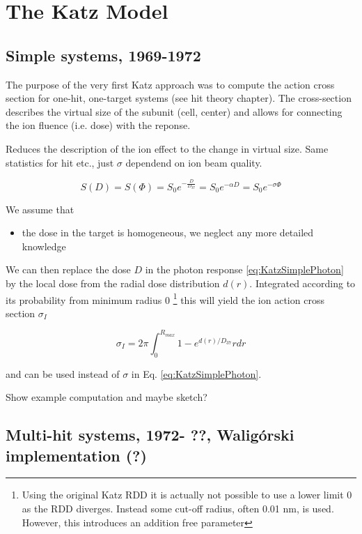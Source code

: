 \chapter{The Katz Model}

\section{Simple systems, 1969-1972}
\label{sec:KatzSimple}
The purpose of the very first Katz approach was to compute the action cross
section for one-hit, one-target systems (see hit theory chapter). The
cross-section describes the virtual size of the subunit (cell, center) and
allows for connecting the ion fluence (i.e. dose) with the reponse. 

Reduces the description of the ion effect to the change in virtual size. Same
statistics for hit etc., just $\sigma$ dependend on ion beam quality.

\begin{equation}
 S(D)=S(\Phi)=S_0 e^{-\frac{D}{D_{37}}}=S_0 e^{-\alpha D}=S_0 e^{-\sigma \Phi}
 \label{eq:KatzSimplePhoton}
\end{equation}

We assume that
\begin{itemize}
  \item the dose in the target is homogeneous, we neglect any more detailed
  knowledge
\end{itemize}

We can then replace the dose $D$ in the photon response
\ref{eq:KatzSimplePhoton} by the local dose from the radial dose distribution
$d(r)$. Integrated according to its probability from minimum radius 0
\footnote{Using the original Katz RDD it is actually not possible to use a
lower limit 0 as the RDD diverges. Instead some cut-off radius, often 0.01
nm, is used. However, this introduces an addition free parameter} this will
yield the ion action cross section $\sigma_I$

\begin{equation}
\label{eq:KatzSimpleCrossSection}
\sigma_I = 2\pi\int_{0}^{R_{max}}{1-e^{d(r)/D_{37}}rdr}
\end{equation}

and can be used instead of $\sigma$ in Eq. \ref{eq:KatzSimplePhoton}.

Show example computation and maybe sketch?



\section{Multi-hit systems, 1972- ??, Walig\'orski implementation (?)}


